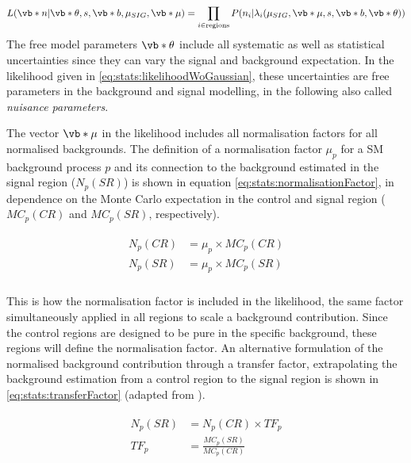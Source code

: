 \begin{align}
L(\vb*{n}|\vb*{\theta}, s, \vb*{b}, \mu_{SIG}, \vb*{\mu}) = \prod_{i \in \text{regions}} P(n_i | \lambda_i(\mu_{SIG},\vb*{\mu}, s, \vb*{b}, \vb*{\theta}))
\label{eq:stats:likelihoodWoGaussian}
\end{align}
The free model parameters $\vb*{\theta}$ include all systematic as well as statistical uncertainties since they can vary the signal and background expectation.  In the likelihood given in \eqref{eq:stats:likelihoodWoGaussian},  these uncertainties are free parameters in the background and signal modelling,  in the following also called \textit{nuisance parameters}. 

The vector $ \vb*{\mu}$ in the likelihood includes all normalisation factors for all normalised backgrounds.  The definition of a normalisation factor $\mu_p$ for a \ac{SM} background process $p$ and its connection to the background estimated in the signal region ($N_p(SR)$) is shown in equation \eqref{eq:stats:normalisationFactor},  in dependence on the Monte Carlo expectation in the control and signal region ($MC_p(CR)$ and $MC_p (SR)$, respectively).  

\begin{align}
\begin{split}
N_p(CR) &= \mu_p \times MC_p(CR)\\
N_p(SR) &= \mu_p \times MC_p (SR)\\
\end{split}
\label{eq:stats:normalisationFactor}
\end{align}

This is how the normalisation factor is included in the likelihood,  the same factor simultaneously applied in all regions to scale a background contribution.  Since the control regions are designed to be pure in the specific background,  these regions will define the normalisation factor. 
An alternative formulation of the normalised background contribution through a transfer factor,  extrapolating the background estimation from a control region to the signal region is shown in \eqref{eq:stats:transferFactor} (adapted from \cite{HistFitter}).  

\begin{align}
\begin{split}
N_p(SR) &= N_p(CR) \times TF_p \\
TF_p &= \frac{MC_p(SR)}{MC_p(CR)}
\end{split}
\label{eq:stats:transferFactor}
\end{align}

